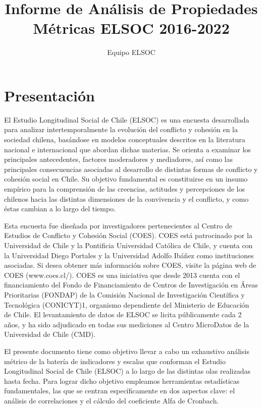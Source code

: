 \documentclass[
  12pt,
]{book}
\title{Informe de Análisis de Propiedades Métricas ELSOC 2016-2022}
\author{Equipo ELSOC}
\date{}
\begin{document}
\maketitle

{
\hypersetup{linkcolor=}
\setcounter{tocdepth}{1}
\tableofcontents
}
\listoffigures
\listoftables
{}
\hypertarget{presentaciuxf3n}{%
\chapter*{Presentación}\label{presentaciuxf3n}}

El Estudio Longitudinal Social de Chile (ELSOC) es una encuesta desarrollada para analizar intertemporalmente la evolución del conflicto y cohesión en la sociedad chilena, basándose en modelos conceptuales descritos en la literatura nacional e internacional que abordan dichas materias. Se orienta a examinar los principales antecedentes, factores moderadores y mediadores, así como las principales consecuencias asociadas al desarrollo de distintas formas de conflicto y cohesión social en Chile. Su objetivo fundamental es constituirse en un insumo empírico para la comprensión de las creencias, actitudes y percepciones de los chilenos hacia las distintas dimensiones de la convivencia y el conflicto, y como éstas cambian a lo largo del tiempo.

Esta encuesta fue diseñada por investigadores pertenecientes al Centro de Estudios de Conflicto y Cohesión Social (COES). COES está patrocinado por la Universidad de Chile y la Pontificia Universidad Católica de Chile, y cuenta con la Universidad Diego Portales y la Universidad Adolfo Ibáñez como instituciones asociadas. Si desea obtener más información sobre COES, visite la página web de COES (www.coes.cl/). COES es una iniciativa que desde 2013 cuenta con el financiamiento del Fondo de Financiamiento de Centros de Investigación en Áreas Prioritarias (FONDAP) de la Comisión Nacional de Investigación Científica y Tecnológica (CONICYT)1, organismo dependiente del Ministerio de Educación de Chile. El levantamiento de datos de ELSOC se licita públicamente cada 2 años, y ha sido adjudicado en todas sus mediciones al Centro MicroDatos de la Universidad de Chile (CMD).

El presente documento tiene como objetivo llevar a cabo un exhaustivo análisis métrico de la batería de indicadores y escalas que conforman el Estudio Longitudinal Social de Chile (ELSOC) a lo largo de las distintas olas realizadas hasta fecha. Para lograr dicho objetivo empleamos herramientas estadísticas fundamentales, las que se centran específicamente en dos aspectos clave: el análisis de correlaciones y el cálculo del coeficiente Alfa de Cronbach.
\end{document}
